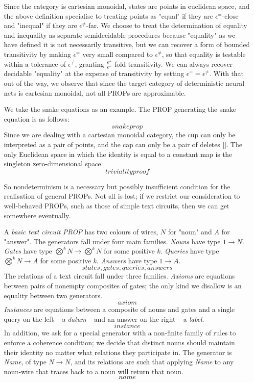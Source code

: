 \begin{fullwidth}
Since the category is cartesian monoidal, states are points in euclidean space, and the above definition specialise to treating points as "equal" if they are $\epsilon^{=}$-close and "inequal" if they are $\epsilon^{\neq}$-far. We choose to treat the determination of equality and inequality as separate semidecidable procedures because "equality" as we have defined it is not necessarily transitive, but we can recover a form of bounded transitivity by making $\epsilon^{=}$ very small compared to $\epsilon^{\neq}$, so that equality is testable within a tolerance of $\epsilon^{\neq}$, granting $\frac{\epsilon^{\neq}}{\epsilon^{=}}$-fold transitivity. We can always recover decidable "equality" at the expense of transitivity by setting $\epsilon^{=} = \epsilon^{\neq}$. With that out of the way, we observe that since the target category of deterministic neural nets is cartesian monoidal, not all PROPs are approximable.

\begin{example}
We take the snake equations as an example. The PROP generating the snake equation is as follows:
\[snakeprop\]
Since we are dealing with a cartesian monoidal category, the cup can only be interpreted as a pair of points, and the cap can only be a pair of deletes []. The only Euclidean space in which the identity is equal to a constant map is the singleton zero-dimensional space.
\[triviality proof\]
\end{example}

So nondeterminism is a necessary but possibly insufficient condition for the realisation of general PROPs. Not all is lost; if we restrict our consideration to well-behaved PROPs, such as those of simple text circuits, then we can get somewhere eventually.

\begin{defn}
A \emph{basic text circuit PROP} has two colours of wires, $N$ for "noun" and $A$ for "answer". The generators fall under four main families. \emph{Nouns} have type $1 \rightarrow N$. \emph{Gates} have type $\bigotimes^k N \rightarrow \bigotimes^k N$ for some positive $k$. \emph{Queries} have type $\bigotimes^k N \rightarrow A$ for some positive $k$. \emph{Answers} have type $1 \rightarrow A$.
\[states, gates, queries, answers\]
The relations of a text circuit fall under three families. \emph{Axioms} are equations between pairs of nonempty composites of gates; the only kind we disallow is an equality between two generators.
\[axiom\]
\emph{Instances} are equations between a composite of nouns and gates and a single query on the left -- a \emph{datum} -- and an answer on the right -- a \emph{label}.
\[instance\]
In addition, we ask for a special generator with a non-finite family of rules to enforce a coherence condition; we decide that distinct nouns should maintain their identity no matter what relations they participate in. The generator is \emph{Name}, of type $N \rightarrow N$, and its relations are such that applying \emph{Name} to any noun-wire that traces back to a noun will return that noun.
\[name\]
\end{defn}


\end{fullwidth}
